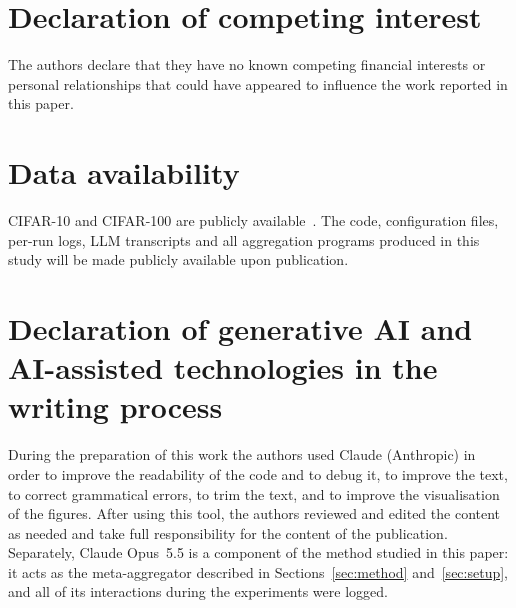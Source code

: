 \documentclass[3p,times,a4paper]{elsarticle}
\begin{document}
\section*{Declaration of competing interest}

The authors declare that they have no known competing financial interests or personal relationships that could have appeared to influence the work reported in this paper.

\section*{Data availability}

CIFAR-10 and CIFAR-100 are publicly available~\cite{krizhevsky2009learning}. The code, configuration files, per-run logs, LLM transcripts and all aggregation programs produced in this study will be made publicly available upon publication.

\section*{Declaration of generative AI and AI-assisted technologies in the writing process}

During the preparation of this work the authors used Claude (Anthropic) in order to improve the readability of the code and to debug it, to improve the text, to correct grammatical errors, to trim the text, and to improve the visualisation of the figures. After using this tool, the authors reviewed and edited the content as needed and take full responsibility for the content of the publication. Separately, Claude Opus~5.5 is a component of the method studied in this paper: it acts as the meta-aggregator described in Sections~\ref{sec:method} and~\ref{sec:setup}, and all of its interactions during the experiments were logged.


\end{document}

